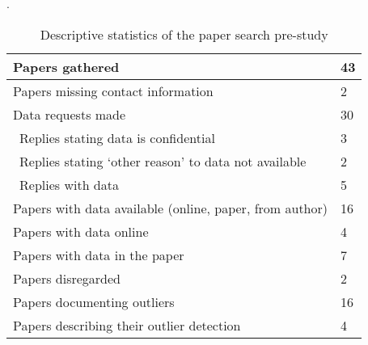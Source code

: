 \begin{table}.
  \caption{Descriptive statistics of the paper search pre-study}
  \label{tab:resultsprestudy-descstat}
  \centering
  {\small
  \begin{tabular}{ll}
    \hline
    Papers gathered & 43 \\
    \hline
    Papers missing contact information & 2 \\
    \hline
    Data requests made & 30 \\
    \hline
    \ Replies stating data is confidential & 3 \\
    \hline
    \ Replies stating `other reason' to data not available & 2  \\
    \hline
    \ Replies with data & 5 \\
    \hline
    Papers with data available (online, paper, from author) & 16 \\
    \hline
    Papers with data online & 4 \\
    \hline
    Papers with data in the paper & 7 \\
    \hline
    Papers disregarded & 2 \\
    \hline
    Papers documenting outliers & 16 \\
    \hline
    Papers describing their outlier detection & 4 \\
    \hline
  \end{tabular}
  }
\end{table}
